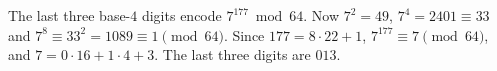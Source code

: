 The last three base-$4$ digits encode $7^{177}\bmod 64$. Now $7^2=49$, $7^4=2401\equiv33$ and $7^8\equiv33^2=1089\equiv1\pmod{64}$. Since $177=8\cdot22+1$, $7^{177}\equiv7\pmod{64}$, and $7=0\cdot16+1\cdot4+3$. The last three digits are $\boxed{013}$.
